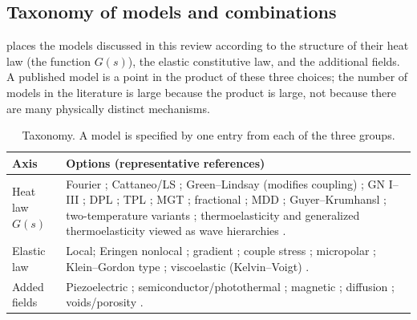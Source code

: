 \subsection{Taxonomy of models and combinations}
 places the models discussed in this review according to the structure of their heat law (the function $G(s)$), the elastic constitutive law, and the additional fields. A published model is a point in the product of these three choices; the number of models in the literature is large because the product is large, not because there are many physically distinct mechanisms.
\begin{table}[ht]\centering\small
\caption{Taxonomy. A model is specified by one entry from each of the three groups.}\label{tab:taxonomy}
\begin{tabularx}{\textwidth}{@{}p{2.6cm}X@{}}\toprule
Axis & Options (representative references)\\\midrule
Heat law $G(s)$ & Fourier \citep{Biot1956}; Cattaneo/LS \citep{Lord1967}; Green--Lindsay (modifies coupling) \citep{Green1972}; GN I--III \citep{Green1991,Green1993}; DPL \citep{Tzou1995}; TPL \citep{RoyChoudhuri2007}; MGT \citep{Quintanilla2019}; fractional \citep{Povstenko2016}; MDD \citep{Wang2011}; Guyer--Krumhansl \citep{GuyerKrumhansl1966II}; two-temperature variants \citep{Youssef2006}; thermoelasticity and generalized thermoelasticity viewed as wave hierarchies \citep{Scott2007}.\\
Elastic law & Local; Eringen nonlocal \citep{Eringen1972,Eringen1974}; gradient \citep{Aifantis1992,Askes2011}; couple stress \citep{MindlinTiersten1962}; micropolar \citep{Eringen1999}; Klein--Gordon type \citep{Lazar2022}; viscoelastic (Kelvin--Voigt) \citep{Gupta2026HeatMap}.\\
Added fields & Piezoelectric \citep{Mindlin1974Thermopiezo}; semiconductor/photothermal \citep{Gupta2023}; magnetic \citep{Ezzat2011}; diffusion \citep{Abouelregal2020a}; voids/porosity \citep{Cowin1983,Iesan1986,Singh2020}.\\\bottomrule
\end{tabularx}
\end{table}

